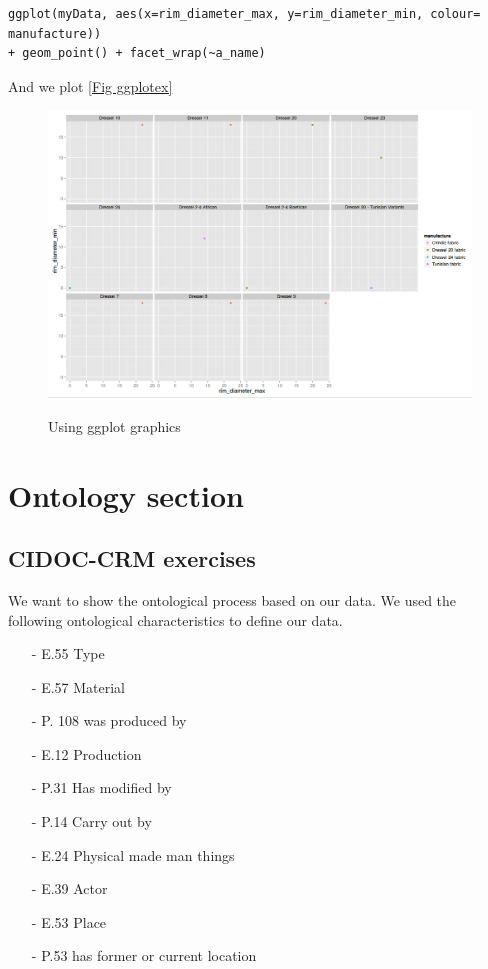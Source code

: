 \documentclass[10pt,a4paper]{article}
\begin{document}
\begin{verbatim}
ggplot(myData, aes(x=rim_diameter_max, y=rim_diameter_min, colour= manufacture)) 
+ geom_point() + facet_wrap(~a_name)
\end{verbatim}


And we plot \ref{Fig ggplotex}

\begin{figure}[hdp]
\centering
\includegraphics[scale=0.30]{ggplot2ex.png}
\label{ggplotex}
\caption{Using ggplot graphics}
\end{figure}


\section{Ontology section}

\subsection{CIDOC-CRM exercises}

We want to show the ontological process based on our data. We used the following ontological characteristics to define our data.
\begin{itemize}
\item[-] E.55 Type
\item[-] E.57 Material
\item[-] P. 108 was produced by
\item[-] E.12 Production
\item[-] P.31 Has modified by
\item[-] P.14 Carry out by
\item[-] E.24 Physical made man things
\item[-] E.39 Actor
\item[-] E.53 Place
\item[-] P.53 has former or current location
\end{itemize}
\end{document}
